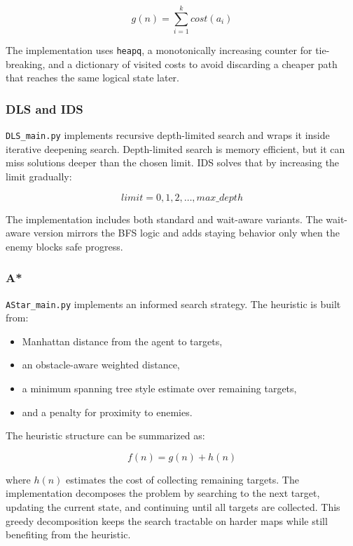 \documentclass[11pt,a4paper]{article}
\newcommand{\code}[1]{\texttt{#1}}
\begin{document}
\begin{equation}
    g(n) = \sum_{i=1}^{k} cost(a_i)
\end{equation}

The implementation uses \code{heapq}, a monotonically increasing counter for tie-breaking, and a dictionary of visited costs to avoid discarding a cheaper path that reaches the same logical state later.

\subsubsection{DLS and IDS}

\code{DLS\_main.py} implements recursive depth-limited search and wraps it inside iterative deepening search. Depth-limited search is memory efficient, but it can miss solutions deeper than the chosen limit. IDS solves that by increasing the limit gradually:

\begin{equation}
    limit = 0, 1, 2, \ldots, max\_depth
\end{equation}

The implementation includes both standard and wait-aware variants. The wait-aware version mirrors the BFS logic and adds staying behavior only when the enemy blocks safe progress.

\subsubsection{A*}

\code{AStar\_main.py} implements an informed search strategy. The heuristic is built from:

\begin{itemize}[leftmargin=*]
    \item Manhattan distance from the agent to targets,
    \item an obstacle-aware weighted distance,
    \item a minimum spanning tree style estimate over remaining targets,
    \item and a penalty for proximity to enemies.
\end{itemize}

The heuristic structure can be summarized as:

\begin{equation}
    f(n) = g(n) + h(n)
\end{equation}

where \(h(n)\) estimates the cost of collecting remaining targets. The implementation decomposes the problem by searching to the next target, updating the current state, and continuing until all targets are collected. This greedy decomposition keeps the search tractable on harder maps while still benefiting from the heuristic.
\end{document}
